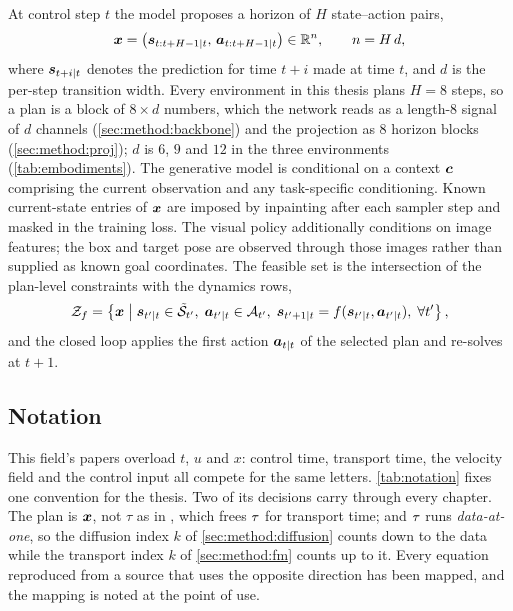 At control step $t$ the model proposes a horizon of $H$ state--action pairs,
\begin{equation}\label{eq:method:plan}
  \boldsymbol{x}
  = \left(\boldsymbol{s}_{t:t+H-1|t},\,\boldsymbol{a}_{t:t+H-1|t}\right) \in \mathbb{R}^{n},
  \qquad n = H\,d,
\end{equation}
where $\boldsymbol{s}_{t+i|t}$ denotes the prediction for time $t+i$ made at time $t$, and $d$ is the
per-step transition width. Every environment in this thesis plans $H = 8$ steps, so a plan is a
block of $8 \times d$ numbers, which the network reads as a length-$8$ signal of $d$ channels
(\autoref{sec:method:backbone}) and the projection as $8$ horizon blocks
(\autoref{sec:method:proj}); $d$ is $6$, $9$ and $12$ in the three environments
(\autoref{tab:embodiments}). The generative model is conditional on a context
$\boldsymbol{c}$ comprising the current observation and any task-specific conditioning. Known current-state entries of
$\boldsymbol{x}$ are imposed by inpainting after each sampler step and masked in the training loss.
The visual policy additionally conditions on image features; the box and target pose are observed
through those images rather than supplied as known goal coordinates.
The feasible set is the intersection of the plan-level constraints with the dynamics rows,
\begin{equation}\label{eq:method:feasible}
  \mathcal{Z}_{f} = \left\{\boldsymbol{x} \;\middle|\;
    \boldsymbol{s}_{t'|t}\in\tilde{\mathcal{S}}_{t'},\;
    \boldsymbol{a}_{t'|t}\in\mathcal{A}_{t'},\;
    \boldsymbol{s}_{t'+1|t} = f(\boldsymbol{s}_{t'|t},\boldsymbol{a}_{t'|t}),\;
    \forall t'\right\},
\end{equation}
and the closed loop applies the first action $\boldsymbol{a}_{t|t}$ of the selected plan and re-solves
at $t+1$.

\subsection{Notation}

This field's papers overload $t$, $u$ and $x$: control time, transport time, the velocity field
and the control input all compete for the same letters. \autoref{tab:notation} fixes one
convention for the thesis. Two of its decisions carry through every chapter. The plan is
$\boldsymbol{x}$, not $\tau$ as in \parencite{romer2025diffusion}, which frees $\tau$ for transport time;
and $\tau$ runs \emph{data-at-one}, so the diffusion index $k$ of \autoref{sec:method:diffusion}
counts down to the data while the transport index $k$ of \autoref{sec:method:fm} counts up to it. Every
equation reproduced from a source that uses the opposite direction has been mapped, and the
mapping is noted at the point of use.

